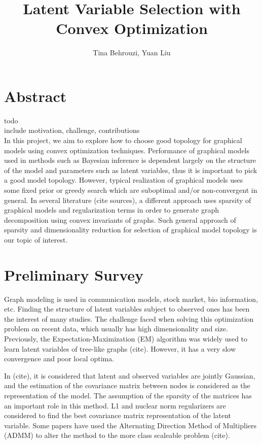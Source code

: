 \documentclass[10pt,conference]{IEEEtran}
\begin{document}
\title{Latent Variable Selection with Convex Optimization}
\author{Tina Behrouzi, Yuan Liu}


\maketitle

\section*{Abstract}
todo\\
include motivation, challenge, contributions\\

In this project, we aim to explore how to choose good topology for graphical models using convex optimization techniques. Performance of graphical models used in methods such as Bayesian inference is dependent largely on the structure of the model and parameters such as latent variables, thus it is important to pick a good model topology. However, typical realization of graphical models uses some fixed prior or greedy search which are suboptimal and/or non-convergent in general. In several literature (cite sources), a different approach uses sparsity of graphical models and regularization terms in order to generate graph decomposition using convex invariants of graphs. Such general approach of sparsity and dimensionality reduction for selection of graphical model topology is our topic of interest.

\vfill\null
\pagebreak

\section*{Preliminary Survey}
Graph modeling is used in communication models, stock market, bio information, etc. Finding the structure of latent variables subject to observed ones has been the interest of many studies. The challenge faced when solving this optimization problem on recent data, which usually has high dimensionality and size. Previously, the Expectation-Maximization (EM) algorithm was widely used to learn latent variables of tree-like graphs (cite). However, it has a very slow convergence and poor local optima.

In (cite), it is considered that latent and observed variables are jointly Gaussian, and the estimation of the covariance matrix between nodes is considered as the representation of the model. The assumption of the sparsity of the matrices has an important role in this method. L1 and nuclear norm regularizers are considered to find the best covariance matrix representation of the latent variable. Some papers have used the Alternating Direction Method of Multipliers (ADMM) to alter the method to the more class scaleable problem (cite).
\end{document}
